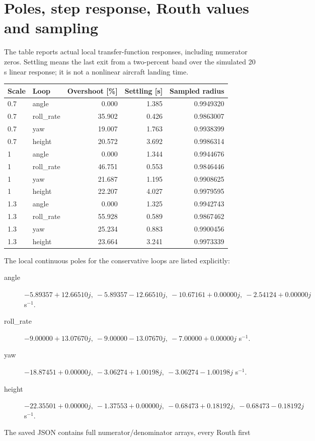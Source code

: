 \section{Poles, step response, Routh values and sampling}
The table reports actual local transfer-function responses, including numerator
zeros. Settling means the last exit from a two-percent band over the simulated
20 s linear response; it is not a nonlinear aircraft landing time.
\begin{center}\small\begin{tabular}{llrrr}\toprule Scale & Loop & Overshoot [\%] & Settling [s] & Sampled radius\\\midrule
0.7 & angle & 0.000 & 1.385 & 0.9949320\\
0.7 & roll\_rate & 35.902 & 0.426 & 0.9863007\\
0.7 & yaw & 19.007 & 1.763 & 0.9938399\\
0.7 & height & 20.572 & 3.692 & 0.9986314\\
1 & angle & 0.000 & 1.344 & 0.9944676\\
1 & roll\_rate & 46.751 & 0.553 & 0.9846446\\
1 & yaw & 21.687 & 1.195 & 0.9908625\\
1 & height & 22.207 & 4.027 & 0.9979595\\
1.3 & angle & 0.000 & 1.325 & 0.9942743\\
1.3 & roll\_rate & 55.928 & 0.589 & 0.9867462\\
1.3 & yaw & 25.234 & 0.883 & 0.9900456\\
1.3 & height & 23.664 & 3.241 & 0.9973339\\
\bottomrule\end{tabular}\end{center}
The local continuous poles for the conservative loops are listed explicitly:
\begin{description}
\item[angle] $-5.89357+12.66510j,\ -5.89357-12.66510j,\ -10.67161+0.00000j,\ -2.54124+0.00000j$ s$^{-1}$.
\item[roll\_rate] $-9.00000+13.07670j,\ -9.00000-13.07670j,\ -7.00000+0.00000j$ s$^{-1}$.
\item[yaw] $-18.87451+0.00000j,\ -3.06274+1.00198j,\ -3.06274-1.00198j$ s$^{-1}$.
\item[height] $-22.35501+0.00000j,\ -1.37553+0.00000j,\ -0.68473+0.18192j,\ -0.68473-0.18192j$ s$^{-1}$.
\end{description}
The saved JSON contains full numerator/denominator arrays, every Routh first
